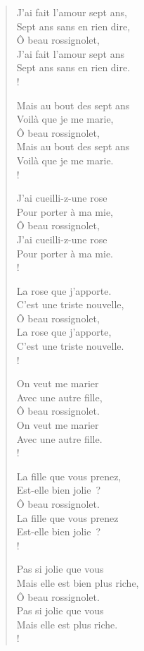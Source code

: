 \documentclass[french,twoside]{book} %
\begin{document}
\begin{verse}
J’ai fait l’amour sept ans,\\
Sept ans sans en rien dire,\\
Ô beau rossignolet,\\
J’ai fait l’amour sept ans\\
Sept ans sans en rien dire.\\!

Mais au bout des sept ans\\
Voilà que je me marie,\\
Ô beau rossignolet,\\
Mais au bout des sept ans\\
Voilà que je me marie.\\!

J’ai cueilli-z-une rose\\
Pour porter à ma mie,\\
Ô beau rossignolet,\\
J’ai cueilli-z-une rose\\
Pour porter à ma mie.\\!

La rose que j’apporte.\\
C’est une triste nouvelle,\\
Ô beau rossignolet,\\
La rose que j’apporte,\\
C’est une triste nouvelle.\\!

On veut me marier\\
Avec une autre fille,\\
Ô beau rossignolet.\\
On veut me marier\\
Avec une autre fille.\\!

La fille que vous prenez,\\
Est-elle bien jolie ?\\
Ô beau rossignolet.\\
La fille que vous prenez\\
Est-elle bien jolie ?\\!

Pas si jolie que vous\\
Mais elle est bien plus riche,\\
Ô beau rossignolet.\\
Pas si jolie que vous\\
Mais elle est plus riche.\\!


\end{verse}
\end{document}
